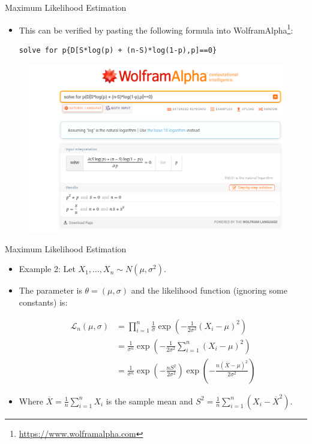 \documentclass[handout]{beamer}
\begin{document}
\begin{frame}[fragile]{Maximum Likelihood Estimation}
\scriptsize{
\begin{itemize}
 \item This can be verified by pasting the following formula into WolframAlpha\footnote{\url{https://www.wolframalpha.com}}:
 
\begin{verbatim}
solve for p{D[S*log(p) + (n-S)*log(1-p),p]==0} 
\end{verbatim}

 
 
\end{itemize}

\begin{figure}[h!]
	\centering
	\includegraphics[scale=0.3]{pics/wolfram_p.png}
\end{figure}



} 
 
\end{frame}


\begin{frame}{Maximum Likelihood Estimation}
\scriptsize{
\begin{itemize}
 \item Example 2: Let  $X_1,\dots, X_n \sim N(\mu,\sigma^2)$. 
 \item The parameter is $\theta=(\mu,\sigma)$ and the likelihood function (ignoring some constants) is:
 
 
  \begin{align}
\mathcal{L}_{n}(\mu,\sigma) & =\prod_{i=1}^n \frac{1}{\sigma} \exp \left( - \frac{1}{2\sigma^2} (X_i -\mu)^2 \right) \\
 & = \frac{1}{\sigma^n}\exp \left( - \frac{1}{2\sigma^2} \sum_{i=1}^n(X_i -\mu)^2 \right) \\
  & = \frac{1}{\sigma^n}\exp \left( - \frac{nS^2}{2\sigma^2} \right)\exp \left( - \frac{n(\overline{X}-\mu)^2}{2\sigma^2} \right)
 \end{align}

\item Where $\overline{X}=\frac{1}{n}\sum_{i=1}^nX_i$ is the sample mean and $S^2 = \frac{1}{n}\sum_{i=1}^n(X_i-\overline{X}^2)$.
\end{itemize}
} 
 
\end{frame}
\end{document}
